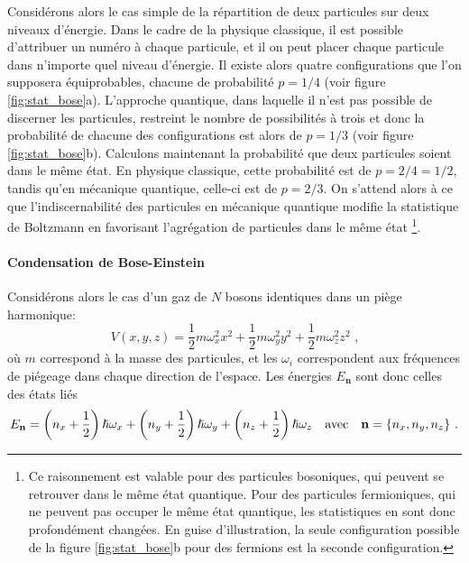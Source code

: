 Considérons alors le cas simple de la répartition de deux particules sur deux niveaux d'énergie. Dans le cadre de la physique classique, il est possible d'attribuer un numéro à chaque particule, et il on peut placer chaque particule dans n'importe quel niveau d'énergie. Il existe alors quatre configurations que l'on supposera équiprobables, chacune de probabilité $p=1/4$ (voir figure \ref{fig:stat_bose}a). L'approche quantique, dans laquelle il n'est pas possible de discerner les particules, restreint le nombre de possibilités à trois et donc la probabilité de chacune des configurations est alors de $p=1/3$ (voir figure \ref{fig:stat_bose}b). Calculons maintenant la probabilité que deux particules soient dans le même état. En physique classique, cette probabilité est de $p=2/4=1/2$, tandis qu'en mécanique quantique, celle-ci est de $p=2/3$. On s'attend alors à ce que l'indiscernabilité des particules en mécanique quantique modifie la statistique de Boltzmann en favorisant l'agrégation de particules dans le même état \footnote{Ce raisonnement est valable pour des particules bosoniques, qui peuvent se retrouver dans le même état quantique. Pour des particules fermioniques, qui ne peuvent pas occuper le même état quantique, les statistiques en sont donc profondément changées. En guise d'illustration, la seule configuration possible de la figure \ref{fig:stat_bose}b pour des fermions est la seconde configuration.}.

\paragraph*{Condensation de Bose-Einstein}
Considérons alors le cas d'un gaz de $N$ bosons identiques dans un piège harmonique:
\begin{equation}
V(x,y,z)=\frac{1}{2}m \omega_x^2 x^2 + \frac{1}{2}m \omega_y^2 y^2 + \frac{1}{2}m \omega_z^2 z^2 \text{ ,}
\label{eq:piege_harmonique}
\end{equation}
où $m$ correspond à la masse des particules, et les $\omega_i$ correspondent aux fréquences de piégeage dans chaque direction de l'espace. Les énergies $E_{\mathbf{n}}$ sont donc celles des états liés
\begin{equation}
E_{\mathbf{n}}=\left(n_x+\frac{1}{2}\right) \hslash \omega_x + \left(n_y+\frac{1}{2}\right) \hslash \omega_y + \left(n_z+\frac{1}{2}\right) \hslash \omega_z \quad \text{avec}\quad \mathbf{n}=\lbrace n_x,n_y,n_z\rbrace \text{ .}
\end{equation}

